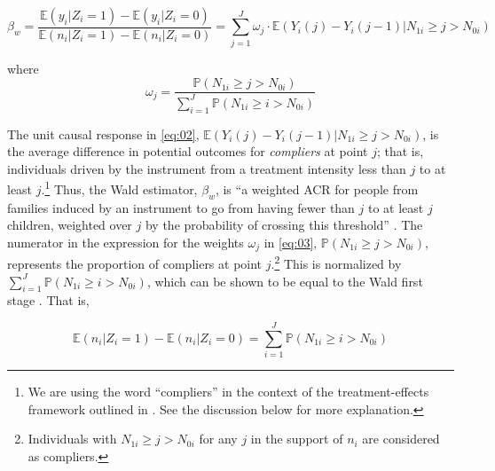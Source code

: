 \begin{equation}\label{eq:02}
	\beta_{w} = \dfrac{\mathbb{E}(y_{i} | Z_{i} = 1) - \mathbb{E}(y_{i} | Z_{i} = 0)}{\mathbb{E}(n_{i} | Z_{i} = 1) - \mathbb{E}(n_{i} | Z_{i} = 0)} = \sum_{j = 1}^{J} \omega_{j}\cdot \mathbb{E}(Y_{i}(j) - Y_{i}(j-1) | N_{1i} \geq j > N_{0i})
\end{equation}

where
\begin{equation}\label{eq:03}
\omega_{j} = \dfrac{\mathbb{P}(N_{1i} \geq j > N_{0i})}{\sum_{i = 1}^{J} \mathbb{P}(N_{1i} \geq i > N_{0i})}
\end{equation}
\vskip10pt

The unit causal response in \eqref{eq:02}, $ \mathbb{E}(Y_{i}(j) - Y_{i}(j-1) | N_{1i} \geq j > N_{0i}) $, is the average difference in potential outcomes for \textit{compliers} at point $ j $; that is, individuals driven by the instrument from a treatment intensity less than $ j $ to at least $ j $.\footnote{We are using the word \enquote{compliers} in the context of the treatment-effects framework outlined in \textcite{angrist_identification_1996}. See the discussion below for more explanation.} Thus, the Wald estimator, $ \beta_{w} $, is \enquote{a weighted ACR for people from families induced by an instrument to go from having fewer than $ j $ to at least $ j $ children, weighted over $ j $ by the probability of crossing this threshold} \parencite[p.~787]{angrist_multiple_2010}. The numerator in the expression for the weights $ \omega_{j} $ in \eqref{eq:03}, $ \mathbb{P}(N_{1i} \geq j > N_{0i}) $, represents the proportion of compliers at point $ j $.\footnote{Individuals with $ N_{1i} \geq j > N_{0i} $  for any $ j $ in the support of $ n_{i} $ are considered as compliers.} This is normalized by $ \sum_{i = 1}^{J} \mathbb{P}(N_{1i} \geq i > N_{0i}) $, which can be shown to be equal to the Wald first stage \parencite[see][p.~183]{Angrist2009}. That is,

\begin{equation}\label{eq:04}
\mathbb{E}(n_{i} | Z_{i} = 1) - \mathbb{E}(n_{i} | Z_{i} = 0) = \sum_{i = 1}^{J} \mathbb{P}(N_{1i} \geq i > N_{0i})
\end{equation}

